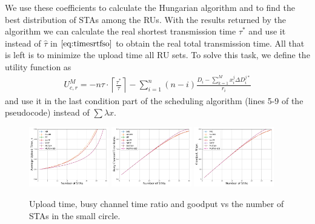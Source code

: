 We use these coefficients to calculate the Hungarian algorithm and to find the best distribution of STAs among the RUs.
With the results returned by the algorithm we can calculate the real shortest transmission time $\tau^*$ and use it instead of $\hat\tau$ in $\eqref{eq:timesrtfso}$ to obtain the real total transmission time.
All that is left is to minimize the upload time all RU sets.
To solve this task, we define the utility function as
\begin{multline}
\label{eq:ulilitysrtfso}
U_{c,r}^{M} = -n \tau \cdot\left\lceil\frac{\tau^*}{\tau}\right\rceil - \sum_{i = 1}^{n} \left(n - i\right) \frac{D_i -  \sum_{k = 1}^{M} x_i^j \Delta D_i^{j*}}{r_{i}}
\end{multline}
and use it in the last condition part of the scheduling algorithm (lines 5-9 of the pseudocode) instead of $\sum \lambda x$.

\begin{figure}[tb]
	\centering
	\includegraphics[width = 0.31\textwidth]{5-d.pdf}
	\includegraphics[width = 0.31\textwidth]{5-e.pdf}
	\includegraphics[width = 0.31\textwidth]{5-t.pdf}
	\caption{\label{fig:10metres}  Upload time, busy channel time ratio and goodput vs the number of STAs in the small circle.}
\end{figure}

